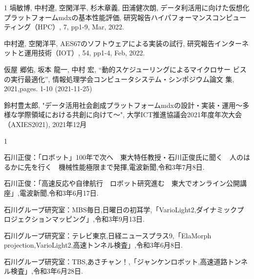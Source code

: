 \begin{発表}{1}
塙敏博, 中村遼, 空閑洋平, 杉木章義, 田浦健次朗, データ利活用に向けた仮想化プラットフォームmdxの基本性能評価, 研究報告ハイパフォーマンスコンピューティング（HPC）, 7, pp1-9, Mar, 2022.

中村遼, 空閑洋平, AES67のソフトウェアによる実装の試行, 研究報告インターネットと運用技術（IOT）, 54, pp1-4, Feb, 2022.

仮屋 郷佑, 坂本 龍一, 中村 宏, ``動的スケジューリングによるマイクロサー
ビスの実行最適化'', 情報処理学会コンピュータシステム・シンポジウム論文
集, 2021,pages. 1-10 (2021-11-25)


鈴村豊太郎, "データ活用社会創成プラットフォームmdxの設計・実装・運用〜多様な学際領域における共創に向けて～", 大学ICT推進協議会2021年度年次大会（AXIES2021), 2021年12月
\end{発表}

%
%

\begin{報道}{1}

石川正俊：「ロボット」100年で次へ　東大特任教授・石川正俊氏に聞く　人のはるかに先を行く　機械性能極限まで発揮,電波新聞,令和3年7月8日.

石川正俊：「高速反応や自律航行　ロボット研究進む　東大でオンライン公開講座」,電波新聞,令和3年6月17日.

石川グループ研究室：MBS毎日,日曜日の初耳学,「VarioLight2,ダイナミックプロジェクションマッピング」,令和3年9月13日.

石川グループ研究室：テレビ東京,日経ニュースプラス9,「ElaMorph projection,VarioLight2,高速トンネル検査」,令和3年6月8日.

石川グループ研究室：TBS,あさチャン！,「ジャンケンロボット,高速道路トンネル検査」,令和3年6月28日.


\end{報道}
